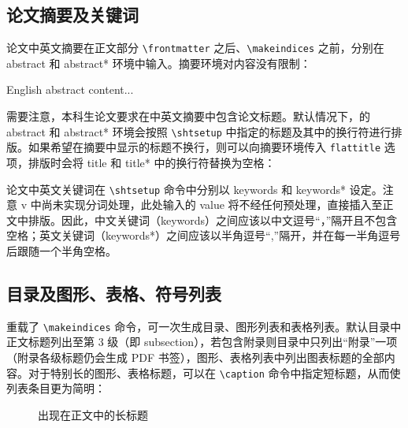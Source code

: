 \documentclass[master]{shtthesis}
\begin{document}
\subsection{论文摘要及关键词}
论文中英文摘要在正文部分 \verb|\frontmatter| 之后、\verb|\makeindices| 之前，分别在 abstract 和 abstract* 环境中输入。摘要环境对内容没有限制：
\begin{latex}
\begin{abstract}
  中文摘要内容...
\end{abstract}

\begin{abstract*}
  English abstract content...
\end{abstract*}
\end{latex}

需要注意，本科生论文要求在中英文摘要中包含论文标题。默认情况下，\shtthesis 的 abstract 和 abstract* 环境会按照 \verb|\shtsetup| 中指定的标题及其中的换行符进行排版。如果希望在摘要中显示的标题不换行，则可以向摘要环境传入 \verb|flattitle| 选项，排版时会将 title 和 title* 中的换行符替换为空格：
\begin{latex}
\begin{abstract}[flattitle]
  中文摘要内容...
\end{abstract}
\end{latex}

论文中英文关键词在 \verb|\shtsetup| 命令中分别以 keywords 和 keywords* 设定。注意 \shtthesis{} v\version{} 中尚未实现分词处理，此处输入的 value 将不经任何预处理，直接插入至正文中排版。因此，中文关键词（keywords）之间应该以中文逗号“，”隔开且不包含空格；英文关键词（keywords*）之间应该以半角逗号“,”隔开，并在每一半角逗号后跟随一个半角空格。
\begin{latex}
\end{latex}

\subsection{目录及图形、表格、符号列表}
\shtthesis{} 重载了 \verb|\makeindices| 命令，可一次生成目录、图形列表和表格列表。默认目录中正文标题列出至第 3 级（即 subsection），若包含附录则目录中只列出“附录”一项（附录各级标题仍会生成 PDF 书签），图形、表格列表中列出图表标题的全部内容。对于特别长的图形、表格标题，可以在 \verb|\caption| 命令中指定短标题，从而使列表条目更为简明：
\begin{latex}
\begin{figure}
  \caption[出现在图形列表内的短标题]{出现在正文中的长标题}
\end{figure}
\end{latex}
\end{document}
